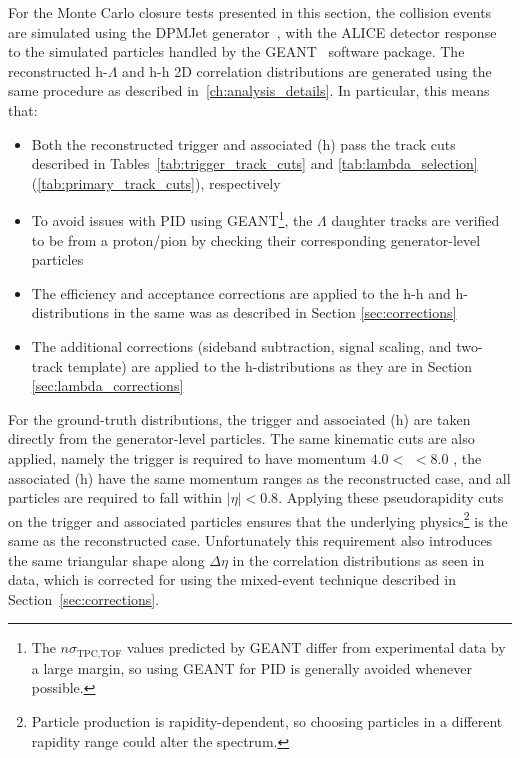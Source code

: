 For the Monte Carlo closure tests presented in this section, the \pPb collision events are simulated using the DPMJet generator~\cite{DPMJet}, with the ALICE detector response to the simulated particles handled by the GEANT~\cite{GEANT} software package. The reconstructed h-$\Lambda$ and h-h 2D correlation distributions are generated using the same procedure as described in~\ref{ch:analysis_details}. In particular, this means that:
%
\begin{itemize}
    \item Both the reconstructed trigger and associated \lmb (h) pass the track cuts described in Tables~\ref{tab:trigger_track_cuts} and \ref{tab:lambda_selection} (\ref{tab:primary_track_cuts}), respectively 
    \item To avoid issues with PID using GEANT\footnote{The $n\sigma_{\text{TPC},\text{TOF}}$ values predicted by GEANT differ from experimental data by a large margin, so using GEANT for PID is generally avoided whenever possible.}, the $\Lambda$ daughter tracks are verified to be from a proton/pion by checking their corresponding generator-level particles
    \item The efficiency and acceptance corrections are applied to the h-h and h-\lmb distributions in the same was as described in Section \ref{sec:corrections}
    \item The additional corrections (sideband subtraction, signal scaling, and two-track template) are applied to the h-\lmb distributions as they are in Section \ref{sec:lambda_corrections}
\end{itemize}
%
For the ground-truth distributions, the trigger and associated \lmb (h) are taken directly from the generator-level particles. The same kinematic cuts are also applied, namely the trigger is required to have momentum $4.0 <$ \pt $< 8.0$ \GeVc, the associated \lmb (h) have the same momentum ranges as the reconstructed case, and all particles are required to fall within $|\eta| < 0.8$. Applying these pseudorapidity cuts on the trigger and associated particles ensures that the underlying physics\footnote{Particle production is rapidity-dependent, so choosing particles in a different rapidity range could alter the spectrum.} is the same as the reconstructed case. Unfortunately this requirement also introduces the same triangular shape along $\Delta\eta$ in the correlation distributions as seen in data, which is corrected for using the mixed-event technique described in Section~\ref{sec:corrections}.

